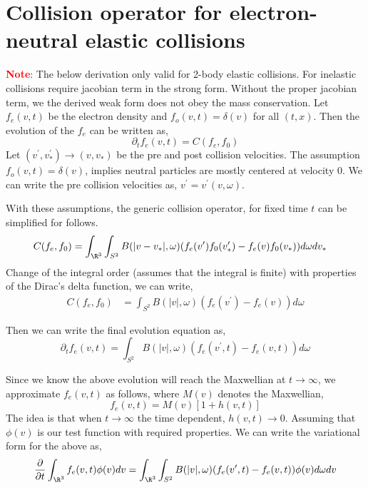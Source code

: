 \section{Collision operator for electron-neutral elastic collisions}
\label{sec:electron_neutral_pc}
\textcolor{red}{\textbf{Note}}: The below derivation only valid for 2-body elastic collisions. For inelastic collisions require jacobian term in the strong form. Without the proper jacobian term, we the derived weak form does not obey the mass conservation. 
Let $f_e(v,t)$ be the electron density and $f_o(v,t)=\delta(v)$ for all $(t,x)$. Then the evolution of the $f_e$ can be written as, 
\begin{equation}
    \partial_t f_e(v,t) = C(f_e,f_0)
\end{equation}
Let $(v^\prime,v_*^\prime) \rightarrow (v,v_*)$ be the pre and post collision velocities. The assumption $f_o(v,t)=\delta(v)$, implies neutral particles are mostly centered at velocity $0$. We can write the pre collision velocities as, $v^\prime=v^\prime(v,\omega)$. 

With these assumptions, the generic collision operator, for fixed time $t$ can be simplified for follows. 
\begin{align}
    C(f_e,f_0) &= \int_{\R^3}\int_{S^2} B(|v-v_*|,\omega)(f_e(v^\prime)f_0(v_*^\prime) - f_e(v)f_0(v_*) ) d\omega dv_*
\end{align}
Change of the integral order (assumes that the integral is finite) with properties of the Dirac's delta function, we can write, 
\begin{align}
    C(f_e,f_0) &= \int_{S^2} B(|v|,\omega)(f_e(v^\prime) - f_e(v)) d\omega
\end{align}

Then we can write the final evolution equation as, 
\begin{equation}
    \partial_t f_e(v,t) = \int_{S^2} B(|v|,\omega)(f_e(v^\prime,t) - f_e(v,t)) d\omega
\end{equation}

Since we know the above evolution will reach the Maxwellian at $t\rightarrow \infty$, we approximate $f_e(v,t)$ as follows, where $M(v)$ denotes the Maxwellian, 
\begin{equation}
    f_e(v,t) = M(v)[1 + h(v,t)] \label{eq:maxwelian}
\end{equation}
The idea is that when $t\rightarrow \infty$ the time dependent, $h(v,t)\rightarrow 0$.
Assuming that $\phi(v)$ is our test function with required properties. We can write the variational form for the above as, 
\begin{equation}
    \frac{\partial}{\partial t} \int_{\R^3} f_e(v,t) \phi(v) dv = \int_{\R^3} \int_{S^2} B(|v|,\omega)(f_e(v^\prime,t) - f_e(v,t)) \phi(v) d\omega dv \label{eq:0d_wf}
\end{equation}

